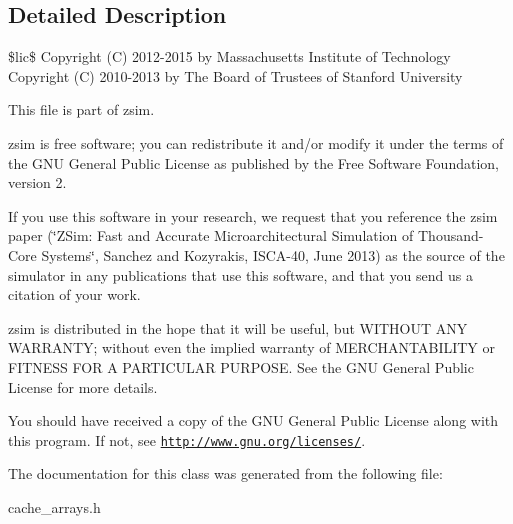 \subsection{Detailed Description}
\$lic\$ Copyright (C) 2012-\/2015 by Massachusetts Institute of Technology Copyright (C) 2010-\/2013 by The Board of Trustees of Stanford University

This file is part of zsim.

zsim is free software; you can redistribute it and/or modify it under the terms of the G\-N\-U General Public License as published by the Free Software Foundation, version 2.

If you use this software in your research, we request that you reference the zsim paper (\char`\"{}\-Z\-Sim\-: Fast and Accurate Microarchitectural Simulation of
\-Thousand-\/\-Core Systems\char`\"{}, Sanchez and Kozyrakis, I\-S\-C\-A-\/40, June 2013) as the source of the simulator in any publications that use this software, and that you send us a citation of your work.

zsim is distributed in the hope that it will be useful, but W\-I\-T\-H\-O\-U\-T A\-N\-Y W\-A\-R\-R\-A\-N\-T\-Y; without even the implied warranty of M\-E\-R\-C\-H\-A\-N\-T\-A\-B\-I\-L\-I\-T\-Y or F\-I\-T\-N\-E\-S\-S F\-O\-R A P\-A\-R\-T\-I\-C\-U\-L\-A\-R P\-U\-R\-P\-O\-S\-E. See the G\-N\-U General Public License for more details.

You should have received a copy of the G\-N\-U General Public License along with this program. If not, see \href{http://www.gnu.org/licenses/}{\tt http\-://www.\-gnu.\-org/licenses/}. 

The documentation for this class was generated from the following file\-:\begin{DoxyCompactItemize}
\item 
cache\-\_\-arrays.\-h\end{DoxyCompactItemize}
